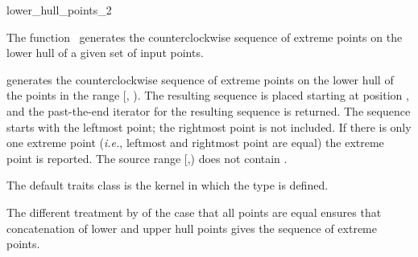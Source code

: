 

\begin{ccRefFunction}{lower_hull_points_2}  %

\ccDefinition
  
The function \ccRefName\ generates the counterclockwise sequence of extreme
points on the lower hull of a given set of input points.



           {generates the counterclockwise sequence of extreme points
            on the lower hull of the points in the range [,
            ). The resulting sequence is placed starting at
            position , and the past-the-end iterator for
            the resulting sequence is returned.
            The sequence starts with the leftmost point;
            the rightmost point is not included.
            If there is only one extreme point ({\it i.e.}, leftmost and
            rightmost point are equal) the extreme point is reported.
            \ccPrecond%
            The source range [,) does not contain
            .}

The default traits class  is the kernel in which the
type  is defined.

The different treatment by  of the case that 
all points are equal ensures that concatenation of lower and upper hull 
points gives the sequence of extreme points.


\end{ccRefFunction}
